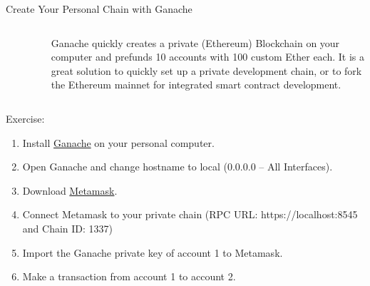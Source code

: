 \documentclass[]{beamer}
\begin{document}
\begin{frame}{Create Your Personal Chain with Ganache}

	\begin{columns}
		\begin{column}{0.15\textwidth}
			\begin{figure}
				\includegraphics[width = \textwidth]{../assets/images/logo_ganache.png}
			\end{figure}
		\end{column}
		\begin{column}{0.85\textwidth}
			Ganache quickly creates a private (Ethereum) Blockchain on your computer and prefunds 10 accounts with 100 custom Ether each. It is a great solution to quickly set up a private development chain, or to fork the Ethereum mainnet for integrated smart contract development.
		\end{column}
	\end{columns}
	\vspace{1em}
	\begin{exercise}{Exercise:}
		\begin{enumerate}
			\item Install \href{https://www.trufflesuite.com/ganache}{\link Ganache} on your personal computer.
			\item Open Ganache and change hostname to local (0.0.0.0 -- All Interfaces).
			\item Download \href{https://metamask.io/}{\link Metamask}.
			\item Connect Metamask to your private chain (RPC URL: https://localhost:8545 and Chain ID: 1337)
			\item Import the Ganache private key of account 1 to Metamask.
			\item Make a transaction from account 1 to account 2.
		\end{enumerate}
	\end{exercise}
\end{frame}
\end{document}
